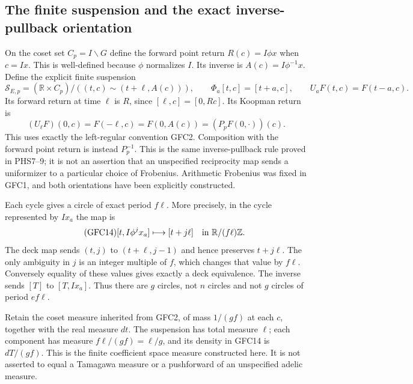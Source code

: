 \subsection{The finite suspension and the exact inverse-pullback orientation}

On the coset set $C_p=I\backslash G$ define the forward point return
$R(c)=I\phi x$ when $c=Ix$. This is well-defined because $\phi$ normalizes
$I$. Its inverse is $A(c)=I\phi^{-1}x$. Define the explicit finite
suspension
\begin{equation}\tag{GFC12}
 \mathcal S_{E,p}=(\mathbb R\times C_p)/
       ((t,c)\sim(t+\ell,A(c))),\qquad
 \Phi_a[t,c]=[t+a,c],\qquad
 U_aF(t,c)=F(t-a,c).
\end{equation}
Its forward return at time $\ell$ is $R$, since
$[\ell,c]=[0,Rc]$. Its Koopman return is
\begin{equation}\tag{GFC13}
 (U_\ell F)(0,c)=F(-\ell,c)=F(0,A(c))
               =(P_p F(0,\cdot))(c).
\end{equation}
This uses exactly the left-regular convention GFC2. Composition with
the forward point return is instead $P_p^{-1}$. This is the same
inverse-pullback rule proved in PHS7--9; it is not an assertion that
an unspecified reciprocity map sends a uniformizer to a particular
choice of Frobenius. Arithmetic Frobenius was fixed in GFC1, and
both orientations have been explicitly constructed.

Each cycle gives a circle of exact period $f\ell$. More precisely,
in the cycle represented by $Ix_a$ the map is
\begin{equation}\tag{GFC14}
 [t,I\phi^jx_a]\longmapsto [t+j\ell]
                   \quad\hbox{in }\mathbb R/(f\ell)\mathbb Z.
\end{equation}
The deck map sends $(t,j)$ to $(t+\ell,j-1)$ and hence preserves
$t+j\ell$. The only ambiguity in $j$ is an integer multiple of $f$,
which changes that value by $f\ell$. Conversely equality of these
values gives exactly a deck equivalence. The inverse sends $[T]$ to
$[T,Ix_a]$. Thus there are $g$ circles, not $n$ circles and not
$g$ circles of period $ef\ell$.

Retain the coset measure inherited from GFC2, of mass $1/(gf)$ at
each $c$, together with the real measure $dt$. The suspension has
total measure $\ell$; each component has measure $f\ell/(gf)=\ell/g$,
and its density in GFC14 is $dT/(gf)$. This is the finite coefficient
space measure constructed here. It is not asserted to equal a
Tamagawa measure or a pushforward of an unspecified adelic measure.

